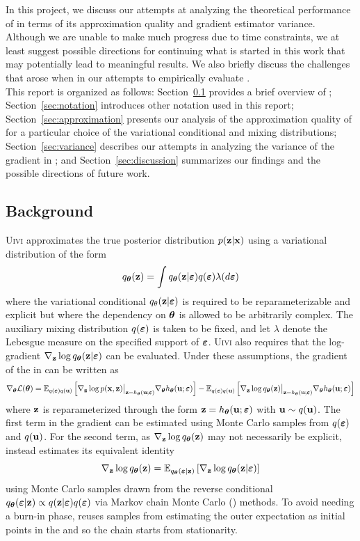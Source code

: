 \documentclass[10pt]{article}
\begin{document}
In this project, we discuss our attempts at analyzing the theoretical performance of \uivi in terms of its approximation quality and gradient estimator variance. Although we are unable to make much progress due to time constraints, we at least suggest possible directions for continuing what is started in this work that may potentially lead to meaningful results. We also briefly discuss the challenges that arose when in our attempts to empirically evaluate \uivi.
\\

This report is organized as follows: Section~\ref{sec:background} provides a brief overview of \uivi; Section~\ref{sec:notation} introduces other notation used in this report; Section~\ref{sec:approximation} presents our analysis of the approximation quality of \uivi for a particular choice of the variational conditional and mixing distributions; Section~\ref{sec:variance} describes our attempts in analyzing the variance of the \elbo gradient in \uivi; and Section~\ref{sec:discussion} summarizes our findings and the possible directions of future work.


\subsection{Background} \label{sec:background}

\textsc{Uivi} approximates the true posterior distribution $p(\mathbf{z}|\mathbf{x})$ using a variational distribution of the form
\[
q_{\bm{\theta}}(\mathbf{z}) = \int q_{\bm{\theta}}(\mathbf{z}|\bm{\varepsilon})q(\bm{\varepsilon})\lambda(d\bm{\varepsilon})
\]
where the variational conditional $q_\theta(\mathbf{z}|\bm{\varepsilon})$ is required to be reparameterizable and explicit but where the dependency on ${\bm{\theta}}$ is allowed to be arbitrarily complex. The auxiliary mixing distribution $q(\bm{\varepsilon})$ is taken to be fixed, and let $\lambda$ denote the Lebesgue measure on the specified support of $\bm{\varepsilon}$. \textsc{Uivi} also requires that the log-gradient $\nabla_{\mathbf{z}}\log q_{\bm{\theta}}(\mathbf{z}|\bm{\varepsilon})$ can be evaluated. Under these assumptions, the gradient of the \elbo in \uivi can be written as
\[
\nabla_{\bm{\theta}} \mathcal{L}({\bm{\theta}}) = \mathbb{E}_{q(\bm{\varepsilon})q(\mathbf{u})}\left[\nabla_{\mathbf{z}} \log p(\mathbf{x},\mathbf{z})\big|_{\mathbf{z}=h_{\bm{\theta}}(\mathbf{u};\bm{\varepsilon})}\nabla_{\bm{\theta}} h_{\bm{\theta}}(\mathbf{u};\bm{\varepsilon})\right] - \mathbb{E}_{q(\bm{\varepsilon})q(\mathbf{u})}\left[\nabla_{\mathbf{z}} \log q_{\bm{\theta}}(\mathbf{z})\big|_{\mathbf{z}=h_{\bm{\theta}}(\mathbf{u};\bm{\varepsilon})}\nabla_{\bm{\theta}} h_{\bm{\theta}}(\mathbf{u};\bm{\varepsilon})\right]
\]
where $\mathbf{z}$ is reparameterized through the form $\mathbf{z} = h_{\bm{\theta}}(\mathbf{u};\bm{\varepsilon})$ with $\mathbf{u}\sim q(\mathbf{u})$. The first term in the gradient can be estimated using Monte Carlo samples from $q(\bm{\varepsilon})$ and $q(\mathbf{u})$. For the second term, as $\nabla_{\mathbf{z}} \log q_{\bm{\theta}}(\mathbf{z})$ may not necessarily be explicit, \uivi instead estimates its equivalent identity
\[
\nabla_{\mathbf{z}} \log q_{\bm{\theta}}(\mathbf{z}) = \mathbb{E}_{q_{\bm{\theta}}(\bm{\varepsilon}|\mathbf{z})}\left[\nabla_{\mathbf{z}}\log q_{\bm{\theta}}(\mathbf{z}|\bm{\varepsilon})\right]
\]
using Monte Carlo samples drawn from the reverse conditional $q_{\bm{\theta}}(\bm{\varepsilon}|\mathbf{z})\propto q(\mathbf{z}|\bm{\varepsilon})q(\bm{\varepsilon})$ via Markov chain Monte Carlo (\mcmc) methods. To avoid needing a burn-in phase, \uivi reuses samples from estimating the outer expectation as initial points in the \mcmc and so the chain starts from stationarity.
\end{document}
